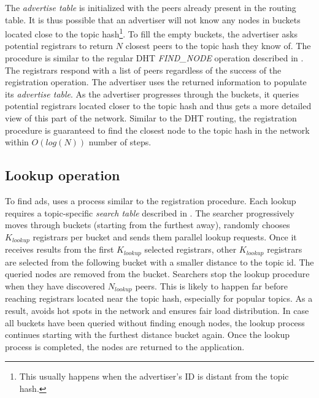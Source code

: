 The \emph{advertise table} is initialized with the peers already present in the routing table. It is thus possible that an advertiser will not know any nodes in buckets located close to the topic hash\footnote{This usually happens when the advertiser's ID is distant from the topic hash.}. 
To fill the empty buckets, the advertiser asks potential registrars to return $N$ closest peers to the topic hash they know of. 
The procedure is similar to the regular DHT \emph{FIND\_NODE} operation described in . 
The registrars respond with a list of peers regardless of the success of the registration operation. 
The advertiser uses the returned information to populate its \emph{advertise table}. 
As the advertiser progresses through the buckets, it queries potential registrars located closer to the topic hash and thus gets a more detailed view of this part of the network. 
Similar to the DHT routing, the registration procedure is guaranteed to find the closest node to the topic hash in the network within $O(log(N))$ number of steps. 

\subsection{Lookup operation}\label{sec:lookup}
To find ads, \sysname uses a process similar to the registration procedure. 
Each lookup requires a topic-specific \emph{search table} described in .
The searcher progressively moves through buckets (starting from the furthest away), randomly chooses $K_\textit{lookup}$ registrars per bucket and sends them parallel lookup requests. 
Once it receives results from the first $K_\textit{lookup}$ selected registrars, other $K_\textit{lookup}$ registrars are selected from the following bucket with a smaller distance to the topic id.
The queried nodes are removed from the bucket.
Searchers stop the lookup procedure when they have discovered $N_\textit{lookup}$ peers. This is likely to happen far before reaching registrars located near the topic hash, especially for popular topics. As a result, \sysname avoids hot spots in the network and ensures fair load distribution. 
In case all buckets have been queried without finding enough nodes, the lookup process continues starting with the furthest distance bucket again. 
Once the lookup process is completed, the nodes are returned to the application.

